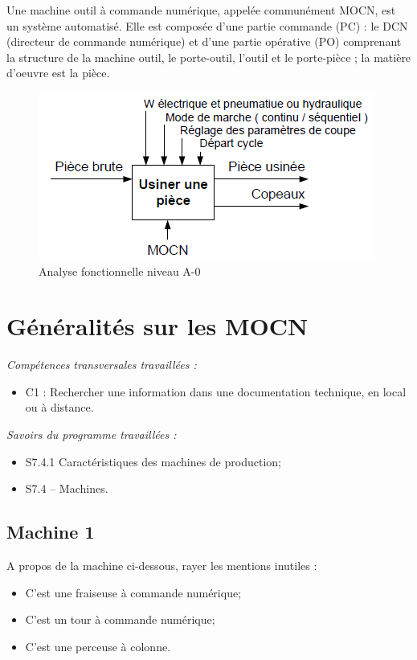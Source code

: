 \documentclass[12pt]{article}
\newcounter{exo}
\newenvironment{exo}{\stepcounter{exo}\vspace{0.5cm}{\bfseries Question \theexo\ :}}{\par\vspace{0.5cm}}
\begin{document}
Une machine outil à commande numérique, appelée communément MOCN, est un système
automatisé. Elle est composée d’une partie commande (PC) : le DCN (directeur de commande
numérique) et d’une partie opérative (PO) comprenant la structure de la machine outil, le porte-outil, l’outil et le porte-pièce ; la matière d’oeuvre est la pièce.
\begin{figure}
\centering
\includegraphics[width=0.7\linewidth]{A0.PNG}
\caption{Analyse fonctionnelle niveau A-0}
\label{A0}
\end{figure}

\newpage

\section{Généralités sur les MOCN}

\begin{minipage}{.55\linewidth}
\textit{Compétences transversales travaillées :}
\begin{itemize}
    \item C1 : Rechercher une information dans une documentation technique, en local ou à distance.
\end{itemize}

\end{minipage}
\begin{minipage}{.44\linewidth}
\textit{Savoirs du programme travaillées :}
\begin{itemize}
    \item S7.4.1 Caractéristiques des machines de production;
    \item S7.4 – Machines.
\end{itemize}
\end{minipage}


\subsection{Machine 1}

\begin{exo}\label{exo1} A propos de la machine ci-dessous, rayer les mentions inutiles :
\begin{itemize}
    \item C'est une fraiseuse à commande numérique;
    \item C'est un tour à commande numérique;
    \item C'est une perceuse à colonne.
\end{itemize}
\end{exo}
\end{document}
